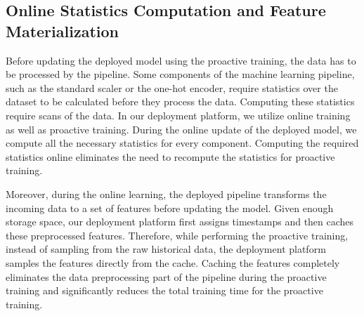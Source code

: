 
\subsection{Online Statistics Computation and Feature Materialization}
Before updating the deployed model using the proactive training, the data has to be processed by the pipeline.
Some components of the machine learning pipeline, such as the standard scaler or the one-hot encoder, require statistics over the dataset to be calculated before they process the data.
Computing these statistics require scans of the data.
In our deployment platform, we utilize online training as well as proactive training.
During the online update of the deployed model, we compute all the necessary statistics for every component.
Computing the required statistics online eliminates the need to recompute the statistics for proactive training.

Moreover, during the online learning, the deployed pipeline transforms the incoming data to a set of features before updating the model.
Given enough storage space, our deployment platform first assigns timestamps and then caches these preprocessed features.
Therefore, while performing the proactive training, instead of sampling from the raw historical data, the deployment platform samples the features directly from the cache.
Caching the features completely eliminates the data preprocessing part of the pipeline during the proactive training and significantly reduces the total training time for the proactive training.

